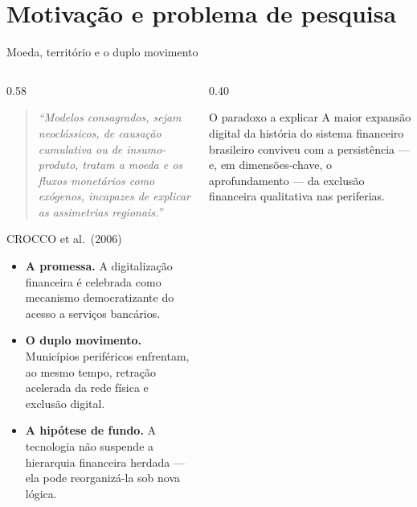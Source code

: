 \documentclass[aspectratio=169,10pt]{beamer}
\newcommand{\az}[1]{\textcolor{cedazul}{\textbf{#1}}}
\begin{document}

\section{Motivação e problema de pesquisa}

\begin{frame}{Moeda, território e o duplo movimento}
  \begin{columns}[T]
    \begin{column}{0.58\textwidth}
      \begin{quote}
        \footnotesize\itshape
        ``Modelos consagrados, sejam neoclássicos, de causação cumulativa ou de
        insumo-produto, tratam a moeda e os fluxos monetários como exógenos,
        incapazes de explicar as assimetrias regionais.''
      \end{quote}
      \vspace{-0.5em}
      \hfill{\scriptsize\color{cedcinza}CROCCO et al.\ (2006)}

      \vspace{0.6em}
      \small
      \begin{itemize}\setlength{\itemsep}{0.45em}
        \item \az{A promessa.} A digitalização financeira é celebrada como
              mecanismo democratizante do acesso a serviços bancários.
        \item \az{O duplo movimento.} Municípios periféricos enfrentam, ao mesmo
              tempo, retração acelerada da rede física e exclusão digital.
        \item \az{A hipótese de fundo.} A tecnologia não suspende a hierarquia
              financeira herdada --- ela pode reorganizá-la sob nova lógica.
      \end{itemize}
    \end{column}
    \begin{column}{0.40\textwidth}
      \begin{alertblock}{O paradoxo a explicar}
        \small
        A maior expansão digital da história do sistema financeiro brasileiro
        conviveu com a persistência --- e, em dimensões-chave, o aprofundamento
        --- da exclusão financeira qualitativa nas periferias.


\end{alertblock}
\end{column}
\end{columns}
\end{frame}
\end{document}
